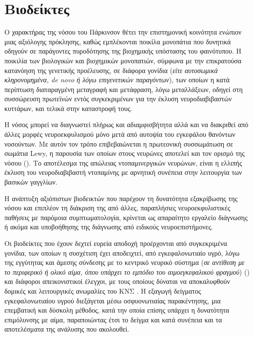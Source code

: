 \documentclass[12pt]{report}
\begin{document}
        \section{Βιοδείκτες}
        Ο χαρακτήρας της νόσου του Πάρκινσον θέτει την επιστημονική κοινότητα ενώπιον μιας αξιόλογης πρόκλησης, καθώς εμπλέκονται ποικίλα μονοπάτια που δυνητικά οδηγούν σε παράγοντες πυροδότησης της βιοχημικής υπόστασης του φαινότυπου. Η ποικιλία των βιολογικών και βιοχημικών μονοπατιών, σύμφωνα με την επικρατούσα κατανόηση της γενετικής προέλευσης, σε διάφορα γονίδια (\emph{είτε αυτοσωμικά κληρονομημένα, de novo ή λόγω επιγενετικών παραγόντων}), των οποίων η κατά περίπτωση διαταραγμένη μεταγραφή και μετάφραση, λόγω μεταλλάξεων, οδηγεί στη συσσώρευση πρωτεϊνών εντός συγκεκριμένων για την έκλυση νευροδιαβιβαστών κυττάρων, και τελικά στην καταστροφή 
        τους.
        \par
        Η νόσος μπορεί να διαγνωστεί πλήρως και αδιαμφισβήτητα αλλά και να διακριθεί από άλλες μορφές νευροεκφυλισμού μόνο μετά από αυτοψία του εγκεφάλου θανόντων νοσούντων. Με αυτόν τον τρόπο επιβεβαιώνεται η πρωτεονική συσσωμάτωση σε σωμάτια Lewy, η παρουσία των οποίων στους νευρώνες αποτελεί και τον ορισμό της νόσου (\emph{\cite{Miller2015BiomarkersFuture}}). Το αποτέλεσμα της απώλειας ντοπαμινεργικών νευρώνων, είναι η ελλιπής έκλυση του νευροδιαβιβαστή ντοπαμίνης με αρνητική συνέπεια στην λειτουργία των βασικών γαγγλίων.
        \par
        Η ανάπτυξη αξιόπιστων βιοδεικτών που παρέχουν τη δυνατότητα εξακρίβωσης της νόσου και επιπλέον τη διάκριση της από άλλες, παραπλήσιες νευροεκφυλιστικές παθήσεις με παρόμοια συμπτωματολογία, κρίνεται ως απαραίτητο εργαλείο διάγνωσης ή ακόμα και υποβοήθησης της διάγνωσης από ειδικούς νευροεπιστήμονες.
        \par
        Οι βιοδείκτες που έχουν δεχτεί ευρεία αποδοχή προέρχονται από συγκεκριμένα γονίδια, των οποίων η συσχέτιση έχει αποδειχτεί, από εγκεφαλονωτιαίο υγρό, λόγω της εγγύτητας και άμεσης σύνδεσης με το κεντρικό νευρικό σύστημα (\emph{σε αντίθεση με το περιφερικό ή ολικό αίμα, όπου υπάρχει το εμπόδιο του αιμοεγκεφαλικού φραγμού}) (\emph{\cite{Miller2015BiomarkersFuture}}) και διάφοροι απεικονιστικοί έλεγχοι, με τους οποίους δύναται να αποκαλυφθούν δομικές και λειτουργικές ανωμαλίες του ΚΝΣ . Η εξαγωγή δείγματος εγκεφαλονωτιαίου υγρού διεξάγεται μέσω οσφυονωτιαίας παρακέντησης, μια επεμβατική και δύσκολη μέθοδος, κατά την οποία επίσης υπάρχει η δυνατότητα επιμόλυνσης με αίμα, παραποιώντας έτσι το δείγμα και κατά συνέπεια και τα αποτελέσματα της ανάλυσης που ακολουθεί.
\end{document}
